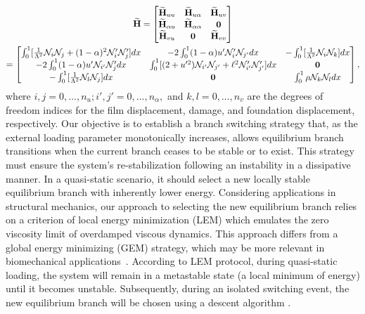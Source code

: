 \documentclass[10pt]{article}
\begin{document}
\begin{multline}
    \widetilde{\mathbf{H}}=
    \begin{bmatrix}
        \widetilde{\mathbf{H}}_{uu}       & \widetilde{\mathbf{H}}_{u\alpha}      & \widetilde{\mathbf{H}}_{uv} \\
        \widetilde{\mathbf{H}}_{\alpha u} & \widetilde{\mathbf{H}}_{\alpha\alpha} & \textbf{0}          \\
        \widetilde{\mathbf{H}}_{vu}       & \textbf{0}                    & \widetilde{\mathbf{H}}_{vv}
    \end{bmatrix}
    \\=
    \begin{bmatrix}
        \int_0^1[ \frac{1}{\Lambda^2}{\mathcal N}_i{\mathcal N}_j + (1-\alpha)^2{\mathcal N}'_i{\mathcal N}'_j] dx         &
        -2\int_0^1(1-\alpha)u' {\mathcal N}'_i {\mathcal N}_{{j'}}  dx                                                     &
        -\int_0^1[\frac{1}{\Lambda^2}{\mathcal N}_i {\mathcal N}_{{k}}]  dx                                                                                                                     \\
        -2\int_0^1(1-\alpha)u' {\mathcal N}_{{i'}} {\mathcal N}'_j dx                                                      &
        \int_0^1 [ (2+u'^2){\mathcal N}_{{i'}}{\mathcal N}_{{j'}} +\ell^2{\mathcal N}'_{{i'}}{\mathcal N}'_{{j'}}] dx &
        \textbf{0}                                                                                                                                                                              \\
        -\int_0^1[\frac{1}{\Lambda^2}{\mathcal N}_{{l}}{\mathcal N}_j ] dx                                                 & \textbf{0} & \int_0^1 \rho {\mathcal N}_{{k}}{\mathcal N}_{{l}} dx
    \end{bmatrix},
    \label{eq:stifness2}
\end{multline}
%
{where $i, j = 0,\dots, n_u; i', j' = 0,\dots, n_\alpha, $ and $k, l = 0,\dots, n_v$ are the degrees of freedom indices for the film displacement, damage, and foundation displacement, respectively.}
Our objective is to establish a branch switching strategy that,
as the external loading parameter monotonically increases, allows equilibrium branch transitions when the current branch ceases to be stable or to exist.
%
This strategy must ensure the system's re-stabilization following an instability in a dissipative manner. In a quasi-static scenario, it should select a new locally stable equilibrium branch with inherently lower energy.  Considering applications in structural mechanics, our approach to selecting the new equilibrium branch relies on a criterion of local energy minimization (LEM) which emulates the zero viscosity limit of overdamped viscous dynamics. This approach differs from a global energy minimizing (GEM) strategy, which may be more relevant in biomechanical applications~\cite{Salman2021-mn}. According to LEM protocol, during quasi-static loading, the system will remain in a metastable state (a local minimum of energy) until it becomes unstable. Subsequently, during an isolated switching event, the new equilibrium branch will be chosen using a descent algorithm \cite{Puglisi2005-lg}.
\end{document}
